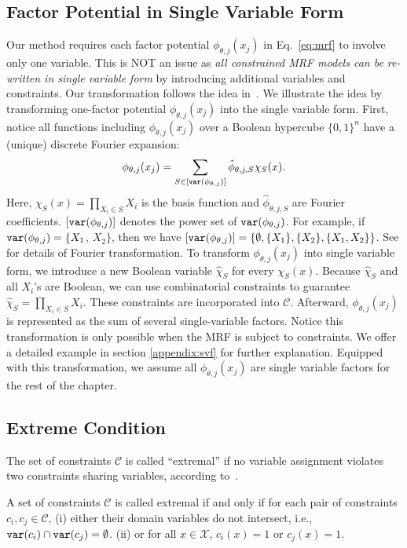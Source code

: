 \subsection{Factor Potential in Single Variable Form}
Our method requires each factor potential $\phi_{\theta,j}(x_j)$ in
Eq.~\eqref{eq:mrf} to involve only one variable.
%
This is NOT an issue as \textit{all constrained MRF models can be re-written in
    single variable form} by introducing additional variables and constraints.
%
Our transformation follows the idea in~\citep{Sang2005}.
%
We illustrate the idea by transforming one-factor potential
$\phi_{\theta,j}(x_j)$ into the single variable form.
%
First, notice all functions including $\phi_{\theta,j}(x_j)$ over a Boolean
hypercube $\{0,1\}^n$ have a (unique) discrete Fourier expansion:
\begin{align}
    \phi_{\theta,j}(x_j) = \sum_{S \in [{\mathtt{var}(\phi_{\theta,j})}]} \hat{\phi}_{\theta,j,S} \chi_S(x).
\end{align}
Here, $\chi_S(x)=\prod_{X_i \in S} X_i$ is the basis function and $\hat{\phi}_{\theta,j,S}$ are Fourier coefficients.
%
$[{\mathtt{var}(\phi_{\theta,j})}]$ denotes the power set of ${\mathtt{var}(\phi_{\theta,j})}$. For example, if $\mathtt{var}(\phi_{\theta,j}) = \{X_1$, $X_2\}$, then  we have $[{\mathtt{var}(\phi_{\theta,j})}]=\{\emptyset, \{X_1\}, \{X_2\}, \{X_1, X_2\}\}$.
%
%
See \citep{Mansour1994LearningBF} for details of Fourier transformation.
%
To transform $\phi_{\theta,j}(x_j)$ into single variable form, we introduce a
new Boolean variable $\hat{\chi}_S$ for every $\chi_S(x)$.
%
Because $\hat{\chi}_S$ and all $X_i$'s are Boolean, we can use combinatorial
constraints to guarantee $\hat{\chi}_S=\prod_{X_i \in S} X_i$.
%
These constraints are incorporated into $\mathcal{C}$.
%
Afterward, $\phi_{\theta,j}(x_j)$ is represented as the sum of several
single-variable factors.
%
Notice this transformation is only possible when the MRF is subject to
constraints.
%
We offer a detailed example in section \ref{appendix:svf} for further
explanation.
%
Equipped with this transformation, we assume all $\phi_{\theta,j}(x_j)$ are
single variable factors for the rest of the chapter.

\subsection{Extreme Condition}  The set of constraints $\mathcal{C}$ is called ``extremal'' if no variable
assignment violates two constraints sharing variables, according
to~\citep{DBLP:journals/jacm/GuoJL19}.
%
\begin{condition} \label{cond:extreme}
    A set of constraints $\mathcal{C}$ is called extremal if and only if for each pair of constraints $c_i ,c_j \in \mathcal{C}$, (i) either their domain variables do not intersect, i.e., ${\mathtt{var}(c_i)} \cap {\mathtt{var}(c_j)} = \emptyset$.  (ii) or for all $x\in \mathcal{X}$, $c_i(x)=1$ or $c_j(x)=1$.
\end{condition}

